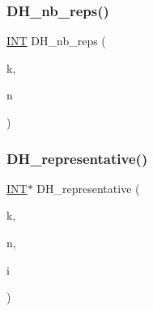 \mbox{\label{data_8_c_a0ed623a9ebb983ff1229e7228a8d97a6}} 
\subsubsection{\texorpdfstring{D\+H\+\_\+nb\+\_\+reps()}{DH\_nb\_reps()}}
{\footnotesize\ttfamily \mbox{\hyperlink{galois_8h_a09fddde158a3a20bd2dcadb609de11dc}{I\+NT}} D\+H\+\_\+nb\+\_\+reps (\begin{DoxyParamCaption}\item[{\mbox{\hyperlink{galois_8h_a09fddde158a3a20bd2dcadb609de11dc}{I\+NT}}}]{k,  }\item[{\mbox{\hyperlink{galois_8h_a09fddde158a3a20bd2dcadb609de11dc}{I\+NT}}}]{n }\end{DoxyParamCaption})}

\mbox{\label{data_8_c_a83c2611d4e75f23ce3f1a0d1615971c1}} 
\subsubsection{\texorpdfstring{D\+H\+\_\+representative()}{DH\_representative()}}
{\footnotesize\ttfamily \mbox{\hyperlink{galois_8h_a09fddde158a3a20bd2dcadb609de11dc}{I\+NT}}$\ast$ D\+H\+\_\+representative (\begin{DoxyParamCaption}\item[{\mbox{\hyperlink{galois_8h_a09fddde158a3a20bd2dcadb609de11dc}{I\+NT}}}]{k,  }\item[{\mbox{\hyperlink{galois_8h_a09fddde158a3a20bd2dcadb609de11dc}{I\+NT}}}]{n,  }\item[{\mbox{\hyperlink{galois_8h_a09fddde158a3a20bd2dcadb609de11dc}{I\+NT}}}]{i }\end{DoxyParamCaption})}

\mbox{\label{data_8_c_a6215d8a94a666db5a9e0d81f67680bea}} 
